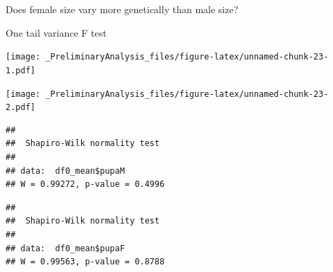 \documentclass[
]{article}
\newenvironment{Shaded}{\begin{snugshade}}{\end{snugshade}}
\newcommand{\CommentTok}[1]{\textcolor[rgb]{0.56,0.35,0.01}{\textit{#1}}}
\newcommand{\DataTypeTok}[1]{\textcolor[rgb]{0.13,0.29,0.53}{#1}}
\newcommand{\KeywordTok}[1]{\textcolor[rgb]{0.13,0.29,0.53}{\textbf{#1}}}
\newcommand{\NormalTok}[1]{#1}
\newcommand{\OperatorTok}[1]{\textcolor[rgb]{0.81,0.36,0.00}{\textbf{#1}}}
\newcommand{\StringTok}[1]{\textcolor[rgb]{0.31,0.60,0.02}{#1}}
\begin{document}
Does female size vary more genetically than male size?

One tail variance F test

\begin{Shaded}
\end{Shaded}

\texttt{[image: \_PreliminaryAnalysis\_files/figure-latex/unnamed-chunk-23-1.pdf]}

\begin{Shaded}
\end{Shaded}

\texttt{[image: \_PreliminaryAnalysis\_files/figure-latex/unnamed-chunk-23-2.pdf]}

\begin{Shaded}
\end{Shaded}

\begin{verbatim}
## 
##  Shapiro-Wilk normality test
## 
## data:  df0_mean$pupaM
## W = 0.99272, p-value = 0.4996
\end{verbatim}

\begin{Shaded}
\end{Shaded}

\begin{verbatim}
## 
##  Shapiro-Wilk normality test
## 
## data:  df0_mean$pupaF
## W = 0.99563, p-value = 0.8788
\end{verbatim}

\begin{Shaded}
\end{Shaded}
\end{document}

